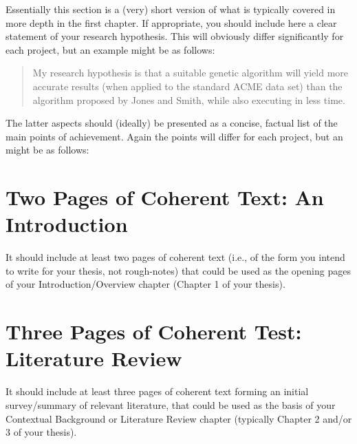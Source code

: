 \documentclass[ %
                    author={James Stephenson},
                supervisor={Dr. Edwin Simpson},
                    degree={MSc},
                     title={Project Plan: Bayesian Deep Learning For Extractive Test Summarisation},
                  subtitle={},
                      type={},
                      year={2022}]{../additions/dissertation}
\begin{document}
		Essentially 
		this section is a (very) short version of what is typically covered in more depth in the first 
		chapter.  If appropriate, you should include here  
		a clear statement of your research hypothesis.  This will obviously differ significantly
		for each project, but an example might be as follows:
		
		\begin{quote}
			My research hypothesis is that a suitable genetic algorithm will yield
			more accurate results (when applied to the standard ACME data set) than 
			the algorithm proposed by Jones and Smith, while also executing in less
			time.
		\end{quote}
		
		\noindent
		The latter aspects should (ideally) be presented as a concise, factual 
		list of the main points of achievement.  Again the points will differ for each project, but 
		an might be as follows:
	
	\mainmatter
	
	
	\chapter{Two Pages of Coherent Text: An Introduction}
	\label{chap:introduction}
		
		It should include at least two pages of coherent text (i.e., of the form you intend to write for your thesis, not rough-notes) that could be used as the opening pages of your Introduction/Overview chapter (Chapter 1 of your thesis). 
		
	
	\chapter{Three Pages of Coherent Test: Literature Review}
	\label{chap:literaturereview}
		
		It should include at least three pages of coherent text forming an initial survey/summary of relevant literature, that could be used as the basis of your Contextual Background or Literature Review chapter (typically Chapter 2 and/or 3 of your thesis). 
		
	
	
\end{document}
